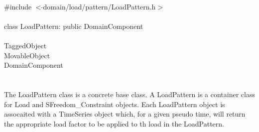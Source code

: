 
   \\
\indent \#include $<\tilde{ }$domain/load/pattern/LoadPattern.h$>$  \\

  \\
\indent class LoadPattern: public DomainComponent  \\

 \\
\indent TaggedObject \\
\indent MovableObject \\
\indent\indent DomainComponent \\
\indent\indent{} \\

 \\ 
\indent The LoadPattern class is a concrete base class. A
LoadPattern is a container class for Load and SFreedom\_Constraint
objects. Each LoadPattern object is assocaited with a TimeSeries
object which, for a given pseudo time, will return the appropriate
load factor to be applied to th load in the LoadPattern. \\

